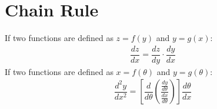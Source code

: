 \documentclass[../main.tex]{subfile}
\begin{document}
    \section{Chain Rule}
    If two functions are defined as $z=f(y)$ and $y=g(x)$:
    \begin{align}
        \dfrac{dz}{dx} = \dfrac{dz}{dy} \cdot \dfrac{dy}{dx}
    \end{align}
    If two functions are defined as $x=f(\theta)$ and $y=g(\theta)$:
    \begin{align}
        \dfrac{d^2 y}{d x^2} = \left[ \dfrac{d}{d \theta} \left( \dfrac{\frac{d y}{d \theta}}{\frac{d x}{d \theta}} \right) \right] \dfrac{d \theta}{dx}
    \end{align}
\end{document}
